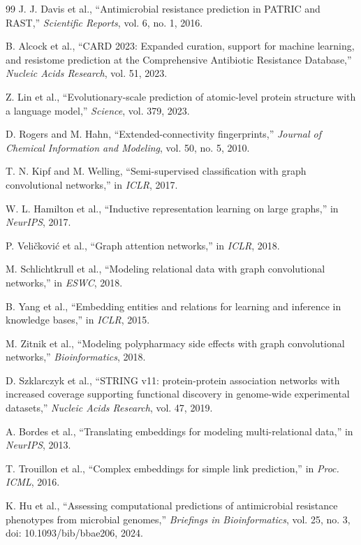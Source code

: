\documentclass[conference]{IEEEtran}
\begin{document}
\begin{thebibliography}{99}
J. J. Davis et al., ``Antimicrobial resistance prediction in PATRIC and RAST,'' \textit{Scientific Reports}, vol. 6, no. 1, 2016.

B. Alcock et al., ``CARD 2023: Expanded curation, support for machine learning, and resistome prediction at the Comprehensive Antibiotic Resistance Database,'' \textit{Nucleic Acids Research}, vol. 51, 2023.

Z. Lin et al., ``Evolutionary-scale prediction of atomic-level protein structure with a language model,'' \textit{Science}, vol. 379, 2023.

D. Rogers and M. Hahn, ``Extended-connectivity fingerprints,'' \textit{Journal of Chemical Information and Modeling}, vol. 50, no. 5, 2010.

T. N. Kipf and M. Welling, ``Semi-supervised classification with graph convolutional networks,'' in \textit{ICLR}, 2017.

W. L. Hamilton et al., ``Inductive representation learning on large graphs,'' in \textit{NeurIPS}, 2017.

P. Veli\v{c}kovi\'{c} et al., ``Graph attention networks,'' in \textit{ICLR}, 2018.

M. Schlichtkrull et al., ``Modeling relational data with graph convolutional networks,'' in \textit{ESWC}, 2018.

B. Yang et al., ``Embedding entities and relations for learning and inference in knowledge bases,'' in \textit{ICLR}, 2015.

M. Zitnik et al., ``Modeling polypharmacy side effects with graph convolutional networks,'' \textit{Bioinformatics}, 2018.

D. Szklarczyk et al., ``STRING v11: protein-protein association networks with increased coverage supporting functional discovery in genome-wide experimental datasets,'' \textit{Nucleic Acids Research}, vol. 47, 2019.

A. Bordes et al., ``Translating embeddings for modeling multi-relational data,'' in \textit{NeurIPS}, 2013.

T. Trouillon et al., ``Complex embeddings for simple link prediction,'' in \textit{Proc. ICML}, 2016.

K. Hu et al., ``Assessing computational predictions of antimicrobial resistance phenotypes from microbial genomes,'' \textit{Briefings in Bioinformatics}, vol. 25, no. 3, doi: 10.1093/bib/bbae206, 2024.

\end{thebibliography}
\end{document}
